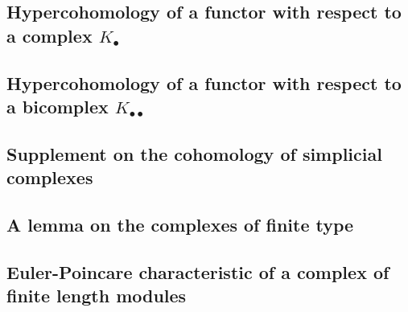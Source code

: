 \begin{proposition}[11.5.3]
\label{0.11.5.3}
\end{proposition}

\begin{remark}[11.5.4]
\label{0.11.5.4}
\end{remark}

\begin{env}[11.5.5]
\label{0.11.5.5}
\end{env}

\begin{env}[11.5.6]
\label{0.11.5.6}
\end{env}

\begin{env}[11.5.7]
\label{0.11.5.7}
\end{env}

\subsection{Hypercohomology of a functor with respect to a complex $K_{\bullet}$}
\label{subsection:0.11.6}

\subsection{Hypercohomology of a functor with respect to a bicomplex $K_{\bullet\bullet}$}
\label{subsection:0.11.7}

\subsection{Supplement on the cohomology of simplicial complexes}
\label{subsection:0.11.8}

\subsection{A lemma on the complexes of finite type}
\label{subsection:0.11.9}

\subsection{Euler-Poincare characteristic of a complex of finite length modules}
\label{subsection:0.11.10}